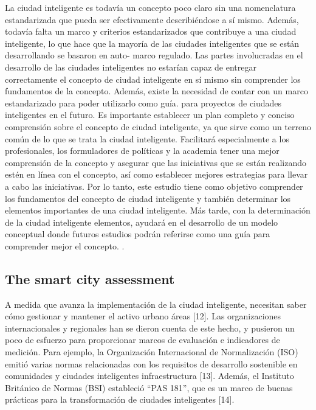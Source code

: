 \documentclass[a4paper,fleqn,spanish]{cas-dc}
\begin{document}
La ciudad inteligente es todavía un concepto poco claro sin una nomenclatura
estandarizada que pueda ser efectivamente describiéndose a sí mismo. Además,
todavía falta un marco y criterios estandarizados que contribuye a una ciudad
inteligente, lo que hace que la mayoría de las ciudades inteligentes que se
están desarrollando se basaron en auto- marco regulado. Las partes involucradas
en el desarrollo de las ciudades inteligentes no estarían capaz de entregar
correctamente el concepto de ciudad inteligente en sí mismo sin comprender los
fundamentos de la concepto. Además, existe la necesidad de contar con un marco
estandarizado para poder utilizarlo como guía.  para proyectos de ciudades
inteligentes en el futuro. Es importante establecer un plan completo y conciso
comprensión sobre el concepto de ciudad inteligente, ya que sirve como un
terreno común de lo que se trata la ciudad inteligente.  Facilitará
especialmente a los profesionales, los formuladores de políticas y la academia
tener una mejor comprensión de la concepto y asegurar que las iniciativas que se
están realizando estén en línea con el concepto, así como establecer mejores
estrategias para llevar a cabo las iniciativas.  Por lo tanto, este estudio
tiene como objetivo comprender los fundamentos del concepto de ciudad
inteligente y también determinar los elementos importantes de una ciudad
inteligente. Más tarde, con la determinación de la ciudad inteligente elementos,
ayudará en el desarrollo de un modelo conceptual donde futuros estudios podrán
referirse como una guía para comprender mejor el concepto.
\cite{wahab_systematic_2020}.

\subsection{The smart city assessment}\label{afirmacion}

A medida que avanza la implementación de la ciudad inteligente, necesitan saber
cómo gestionar y mantener el activo urbano áreas [12]. Las organizaciones
internacionales y regionales han se dieron cuenta de este hecho, y pusieron un
poco de esfuerzo para proporcionar marcos de evaluación e indicadores de
medición. Para ejemplo, la Organización Internacional de Normalización (ISO)
emitió varias normas relacionadas con los requisitos de desarrollo sostenible en
comunidades y ciudades inteligentes infraestructura [13]. Además, el Instituto
Británico de Normas (BSI) estableció “PAS 181”, que es un marco de buenas
prácticas para la transformación de ciudades inteligentes [14].
\end{document}
